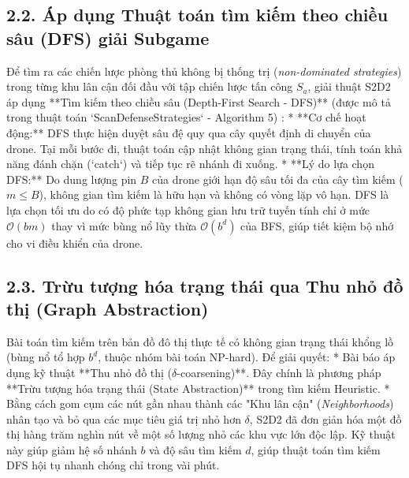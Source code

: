 \documentclass[../main.tex]{subfiles}
\begin{document}
\subsection{2.2. Áp dụng Thuật toán tìm kiếm theo chiều sâu (DFS) giải Subgame}
Để tìm ra các chiến lược phòng thủ không bị thống trị (\textit{non-dominated strategies}) trong từng khu lân cận đối đầu với tập chiến lược tấn công $S_a$, giải thuật S2D2 áp dụng **Tìm kiếm theo chiều sâu (Depth-First Search - DFS)** (được mô tả trong thuật toán `ScanDefenseStrategies` - Algorithm 5) \cite{mutzari2025defending}:
*   **Cơ chế hoạt động:** DFS thực hiện duyệt sâu đệ quy qua cây quyết định di chuyển của drone. Tại mỗi bước đi, thuật toán cập nhật không gian trạng thái, tính toán khả năng đánh chặn (`catch`) và tiếp tục rẽ nhánh đi xuống.
*   **Lý do lựa chọn DFS:** Do dung lượng pin $B$ của drone giới hạn độ sâu tối đa của cây tìm kiếm ($m \le B$), không gian tìm kiếm là hữu hạn và không có vòng lặp vô hạn. DFS là lựa chọn tối ưu do có độ phức tạp không gian lưu trữ tuyến tính chỉ ở mức $\mathcal{O}(bm)$ thay vì mức bùng nổ lũy thừa $\mathcal{O}(b^d)$ của BFS, giúp tiết kiệm bộ nhớ cho vi điều khiển của drone.

\subsection{2.3. Trừu tượng hóa trạng thái qua Thu nhỏ đồ thị (Graph Abstraction)}
Bài toán tìm kiếm trên bản đồ đô thị thực tế có không gian trạng thái khổng lồ (bùng nổ tổ hợp $b^d$, thuộc nhóm bài toán NP-hard). Để giải quyết:
*   Bài báo áp dụng kỹ thuật **Thu nhỏ đồ thị ($\delta$-coarsening)**. Đây chính là phương pháp **Trừu tượng hóa trạng thái (State Abstraction)** trong tìm kiếm Heuristic.
*   Bằng cách gom cụm các nút gần nhau thành các "Khu lân cận" (\textit{Neighborhoods}) nhân tạo và bỏ qua các mục tiêu giá trị nhỏ hơn $\delta$, S2D2 đã đơn giản hóa một đồ thị hàng trăm nghìn nút về một số lượng nhỏ các khu vực lớn độc lập. Kỹ thuật này giúp giảm hệ số nhánh $b$ và độ sâu tìm kiếm $d$, giúp thuật toán tìm kiếm DFS hội tụ nhanh chóng chỉ trong vài phút.
\end{document}
